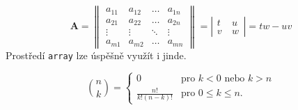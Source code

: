 \documentclass[a4paper, 11pt, twocolumn]{article}
\theoremstyle{definition}
\theoremstyle{plain}
\begin{document}
        $$
        \mathbf{A}=\left\|
        \begin{array}{cccc} a_{11} & a_{12} & \ldots & a_{1 n} \\
        a_{21} & a_{22} & \ldots & a_{2 n} \\ 
        \vdots & \vdots & \ddots & \vdots \\
        a_{m 1} & a_{m 2} & \ldots & a_{m n} 
        \end{array}
        \right\|=\left|\begin{array}{cc}
        t & u~\\ 
        v~& w
        \end{array}\right| = tw - uv
        $$
        Prostředí \verb+array+ lze úspěšně využít i jinde.
        
        $$
    		\binom{n}{k}=
    		\left\{
    		\begin{array}{ll}
    			0 & \text{pro } k < 0 \text{ nebo } k > n\\
    			\frac{n!}{k! (n - k)!} & \text{pro } 0 \leq k \leq n. 
    		\end{array}
    		\right.
        $$
        
\end{document}
